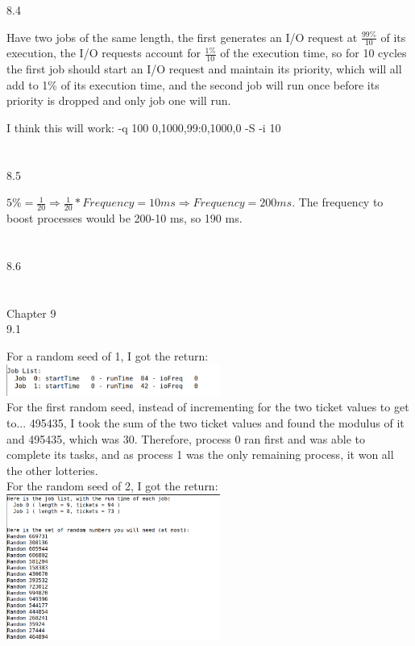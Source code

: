 \documentclass[12pt, a4paper]{article}
\begin{document}
8.4

Have two jobs of the same length, the first generates an I/O request at \(\frac{99\%}{10}\) of its execution, the I/O requests account for \(\frac{1\%}{10}\) of the execution time, so for 10 cycles  the first job should start an I/O request and maintain its priority, which will all add to 1\% of its execution time, and the second job will run once before its priority is dropped and only job one will run.

I think this will work: -q 100 0,1000,99:0,1000,0  -S -i 10 \\ \\ \\

8.5

\( 5\% = \frac{1}{20} \Rightarrow \frac{1}{20} * Frequency = 10ms  \Rightarrow Frequency = 200 ms.\) The frequency to boost processes would be 200-10 ms, so 190 ms. \\ \\ \\

8.6\\ \\ \\



\noindent
Chapter 9\\

9.1

For a random seed of 1, I got the return:
\includegraphics[width=7cm]{hw2_8_1.png} \\ 

For the first random seed, instead of incrementing for the two ticket values to get to... 495435, I took the sum of the two ticket values and found the modulus of it and 495435, which was 30. Therefore, process 0 ran first and was able to complete its tasks, and as process 1 was the only remaining process, it won all the other lotteries. \\

For the random seed of 2, I got the return:\\
\includegraphics[width=7cm]{hw2_9_1_b.png} \\
\end{document}
